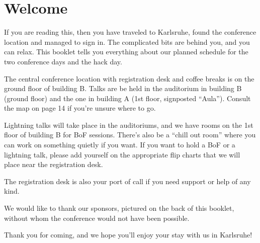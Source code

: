 \newpage
\section*{Welcome} \label{welcome}
If you are reading this, then you have traveled to
Karls\-ruhe, found the conference location and managed to
sign in. The complicated bits are behind you, and
you can relax. This booklet tells you everything about our planned
schedule for the two conference days and the hack day.

The central conference location with registration desk and
coffee breaks is on the ground floor of building B. Talks are
be held in the auditorium in building B (ground floor) and
the one in building A (1st floor, signposted ``Aula''). Consult 
the map on page 14 if you're unsure where to go.

Lightning talks will take place in the auditoriums, 
and we have rooms on
the 1st floor of building B for BoF sessions. There's also be a ``chill out
room'' where you can work on something quietly if you
want. If you want to hold a BoF or a lightning talk, please
add yourself on the appropriate flip charts that we will
place near the registration desk.

The registration desk is also your port of call if you need
support or help of any kind. 

\vspace{0.4em}

We would like to thank our sponsors, pictured on the back
of this booklet, without whom the conference would not
have been possible.

\vspace{0.4em}
Thank you for coming, and we hope you'll enjoy your stay with us in Karlsruhe!
